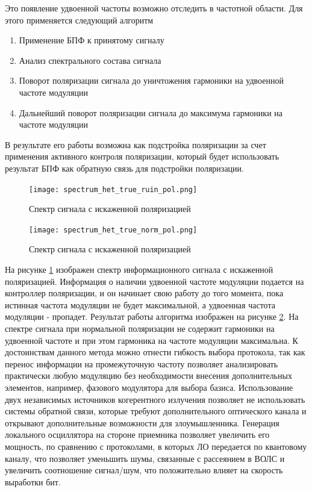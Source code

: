 Это появление удвоенной частоты возможно отследить в частотной области. Для этого применяется следующий алгоритм 
\begin{enumerate}
    \item Применение БПФ к принятому сигналу
    \item Анализ спектрального состава сигнала
    \item Поворот поляризации сигнала до уничтожения гармоники на удвоенной частоте модуляции
    \item Дальнейший поворот поляризации сигнала до максимума гармоники на частоте модуляции
\end{enumerate}
В результате его работы возможна как подстройка поляризации за счет применения активного контроля поляризации, который будет использовать результат БПФ как обратную связь для подстройки поляризации. 
\begin{figure}
    \centering
    \texttt{[image: spectrum\_het\_true\_ruin\_pol.png]}
    \caption{Спектр сигнала с искаженной поляризацией}
    \label{fig:ref ruin pol}
\end{figure}
\begin{figure}
    \centering
    \texttt{[image: spectrum\_het\_true\_norm\_pol.png]}
    \caption{Спектр сигнала с искаженной поляризацией}
    \label{fig:ref norm pol}
\end{figure}
На рисунке \ref{fig:ref ruin pol} изображен спектр информационного сигнала с искаженной поляризацией. Информация о наличии удвоенной частоте модуляции подается на контроллер поляризации, и он начинает свою работу до того момента, пока истинная частота модуляции не будет максимальной, а удвоенная частота модуляции - пропадет. Результат работы алгоритма изображен на рисунке \ref{fig:ref norm pol}. На спектре сигнала при нормальной поляризации не содержит гармоники на удвоенной частоте и при этом гармоника на частоте модуляции максимальна.
\newline К достоинствам данного метода можно отнести гибкость выбора протокола, так как перенос информации на промежуточную частоту позволяет анализировать практически любую модуляцию без необходимости внесения дополнительных элементов, например, фазового модулятора для выбора базиса. Использование двух независимых источников когерентного излучения позволяет не использовать системы обратной связи, которые требуют дополнительного оптического канала и открывают дополнительные возможности для злоумышленника. Генерация локального осциллятора на стороне приемника позволяет увеличить его мощность, по сравнению с протоколами, в которых ЛО передается по квантовому каналу, что позволяет уменьшить шумы, связанные с рассеянием в ВОЛС и увеличить соотношение сигнал/шум, что положительно влияет на скорость выработки бит. 
